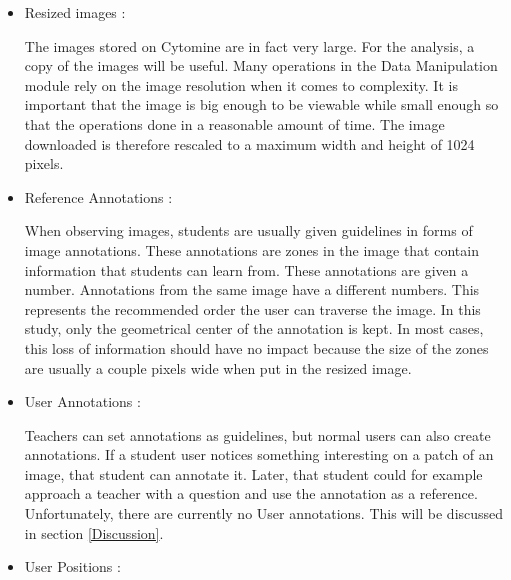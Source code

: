 \documentclass[a4paper,11pt]{report}
\numberwithin{figure}{section} %
\begin{document}
          \begin{itemize}
          \item[\textbullet] Resized images :\newline
          
          The images stored on Cytomine are in fact very large. For the analysis, a copy of the images will be useful. Many operations in the Data Manipulation module rely on the image resolution when it comes to complexity. It is important that the image is big enough to be viewable while small enough so that the operations done in a reasonable amount of time. The image downloaded is therefore rescaled to a maximum width and height of 1024 pixels.\\
          \item[\textbullet] Reference Annotations :\newline
          
          When observing images, students are usually given guidelines in forms of image annotations. These annotations are zones in the image that contain information that students can learn from. These annotations are given a number. Annotations from the same image have a different numbers. This represents the recommended order the user can traverse the image. In this study, only the geometrical center of the annotation is kept. In most cases, this loss of information should have no impact because the size of the zones are usually a couple pixels wide when put in the resized image.\\
		\item[\textbullet]  User Annotations :\newline
        
        Teachers can set annotations as guidelines, but normal users can also create annotations. If a student user notices something interesting on a patch of an image, that student can annotate it. Later, that student could for example approach a teacher with a question and use the annotation as a reference. Unfortunately, there are currently no User annotations. This will be discussed in section \ref{Discussion}.\\
        
        \item[\textbullet]  User Positions :\newline
        

\end{itemize}
\end{document}
